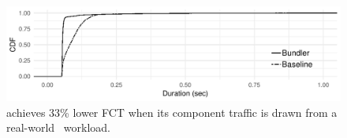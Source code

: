 \begin{figure}
    \centering
\begin{knitrout}
\color{fgcolor}
\includegraphics[width=\maxwidth]{figure/robust_caida-1} 

\end{knitrout}
    \caption{\name achieves 33\% lower FCT when its component traffic is drawn from a real-world~\cite{caida-dataset} workload.}
    \label{fig:robust:caidacdf}
\end{figure}
